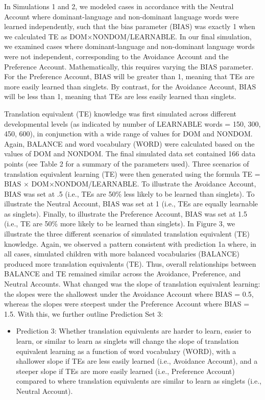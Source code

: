 \documentclass[
  english,
  ,man,floatsintext]{apa6}
\providecommand{\tightlist}{%
  \setlength{\itemsep}{0pt}\setlength{\parskip}{0pt}}
\begin{document}
In Simulations 1 and 2, we modeled cases in accordance with the Neutral Account where dominant-language and non-dominant language words were learned independently, such that the bias parameter (BIAS) was exactly 1 when we calculated TE as DOM×NONDOM/LEARNABLE. In our final simulation, we examined cases where dominant-language and non-dominant language words were not independent, corresponding to the Avoidance Account and the Preference Account. Mathematically, this requires varying the BIAS parameter. For the Preference Account, BIAS will be greater than 1, meaning that TEs are more easily learned than singlets. By contrast, for the Avoidance Account, BIAS will be less than 1, meaning that TEs are less easily learned than singlets.

Translation equivalent (TE) knowledge was first simulated across different developmental levels (as indicated by number of LEARNABLE words = 150, 300, 450, 600), in conjunction with a wide range of values for DOM and NONDOM. Again, BALANCE and word vocabulary (WORD) were calculated based on the values of DOM and NONDOM. The final simulated data set contained 166 data points (see Table 2 for a summary of the parameters used). Three scenarios of translation equivalent learning (TE) were then generated using the formula TE = BIAS × DOM×NONDOM/LEARNABLE. To illustrate the Avoidance Account, BIAS was set at .5 (i.e., TEs are 50\% less likely to be learned than singlets). To illustrate the Neutral Account, BIAS was set at 1 (i.e., TEs are equally learnable as singlets). Finally, to illustrate the Preference Account, BIAS was set at 1.5 (i.e., TE are 50\% more likely to be learned than singlets). In Figure 3, we illustrate the three different scenarios of simulated translation equivalent (TE) knowledge. Again, we observed a pattern consistent with prediction 1a where, in all cases, simulated children with more balanced vocabularies (BALANCE) produced more translation equivalents (TE). Thus, overall relationships between BALANCE and TE remained similar across the Avoidance, Preference, and Neutral Accounts. What changed was the slope of translation equivalent learning: the slopes were the shallowest under the Avoidance Account where BIAS = 0.5, whereas the slopes were steepest under the Preference Account where BIAS = 1.5. With this, we further outline Prediction Set 3:

\begin{itemize}
\tightlist
\item
  Prediction 3: Whether translation equivalents are harder to learn, easier to learn, or similar to learn as singlets will change the slope of translation equivalent learning as a function of word vocabulary (WORD), with a shallower slope if TEs are less easily learned (i.e., Avoidance Account), and a steeper slope if TEs are more easily learned (i.e., Preference Account) compared to where translation equivalents are similar to learn as singlets (i.e., Neutral Account).
\end{itemize}
\end{document}

